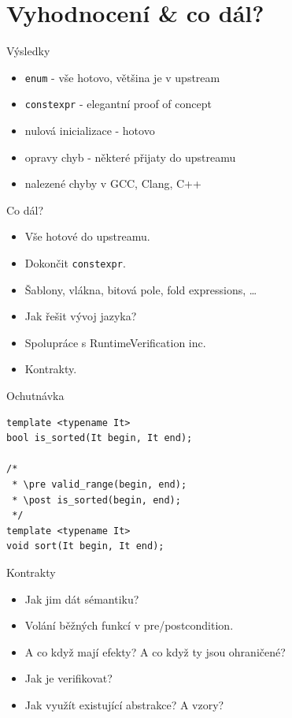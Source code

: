 \documentclass[11pt]{beamer}
\begin{document}
\section{Vyhodnocení \& co dál?}

\begin{frame}{Výsledky}
\begin{itemize}
\pause \item \texttt{enum} - vše hotovo, většina je v upstream
\pause \item \texttt{constexpr} - elegantní proof of concept
\pause \item nulová inicializace - hotovo
\pause \item opravy chyb - některé přijaty do upstreamu
\pause \item nalezené chyby v GCC, Clang, C++
\end{itemize}
\end{frame}

\begin{frame}{Co dál?}
\begin{itemize}
\pause \item Vše hotové do upstreamu.
\pause \item Dokončit \texttt{constexpr}.
\pause \item Šablony, vlákna, bitová pole, fold expressions, \ldots
\pause \item Jak řešit vývoj jazyka?
\pause \item Spolupráce s RuntimeVerification inc.
\pause \item Kontrakty.
\end{itemize}
\end{frame}


\begin{frame}[fragile=singleslide]{Ochutnávka}
\begin{lstlisting}
template <typename It>
bool is_sorted(It begin, It end);

/*
 * \pre valid_range(begin, end);
 * \post is_sorted(begin, end);
 */
template <typename It>
void sort(It begin, It end);
\end{lstlisting}
\end{frame}


\begin{frame}{Kontrakty}
\begin{itemize}
\pause \item Jak jim dát sémantiku?
\pause \item Volání běžných funkcí v pre/postcondition.
\pause \item A co když mají efekty? A co když ty jsou ohraničené?
\pause \item Jak je verifikovat?
\pause \item Jak využít existující abstrakce? A vzory?
\end{itemize}
\end{frame}

\end{document}

